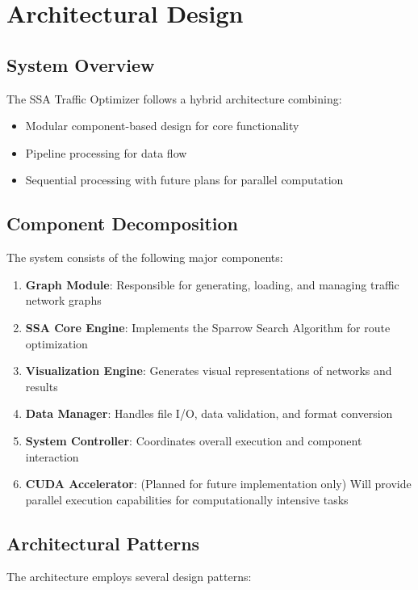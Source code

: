 \documentclass[conference]{IEEEtran}
\begin{document}
\section{Architectural Design}

\subsection{System Overview}
The SSA Traffic Optimizer follows a hybrid architecture combining:
\begin{itemize}
    \item Modular component-based design for core functionality
    \item Pipeline processing for data flow
    \item Sequential processing with future plans for parallel computation
\end{itemize}

\subsection{Component Decomposition}
The system consists of the following major components:

\begin{enumerate}
    \item \textbf{Graph Module}: Responsible for generating, loading, and managing traffic network graphs
    \item \textbf{SSA Core Engine}: Implements the Sparrow Search Algorithm for route optimization
    \item \textbf{Visualization Engine}: Generates visual representations of networks and results
    \item \textbf{Data Manager}: Handles file I/O, data validation, and format conversion
    \item \textbf{System Controller}: Coordinates overall execution and component interaction
    \item \textbf{CUDA Accelerator}: (Planned for future implementation only) Will provide parallel execution capabilities for computationally intensive tasks
\end{enumerate}

\subsection{Architectural Patterns}

The architecture employs several design patterns:
\end{document}
